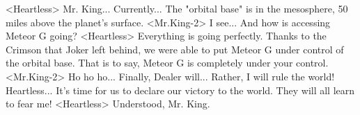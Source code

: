 <Heartless> Mr. King... 
Currently... 
The "orbital base" is in the mesosphere, 50 miles above the planet's surface. 
<Mr.King-2> I see... And how is accessing Meteor G going? 
<Heartless> Everything is going perfectly. 
Thanks to the Crimson that Joker left behind, we were 
able to put Meteor G under control of the orbital base. 
That is to say, Meteor G is completely under your control. 
<Mr.King-2> Ho ho ho... 
Finally, Dealer will... Rather, I will rule the world! 
Heartless... It's time for us to declare our victory to the world. 
They will all learn to fear me! 
<Heartless> Understood, Mr. King. 
